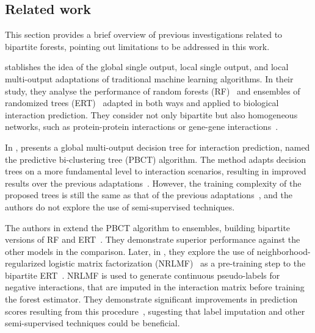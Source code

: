 \begin{itemize}


\section{Related work}
\label{sec:related_work}


This section provides a brief overview of previous investigations related to bipartite forests, pointing out limitations to be addressed in this work.

 stablishes the idea of the global single output, local single output, and local multi-output adaptations of traditional machine learning algorithms. In their study, they analyse the performance of random forests (RF)~\cite{breiman2001random} and ensembles of randomized trees (ERT)~\cite{geurts2006extremely} adapted in both ways and applied to biological interaction prediction. They consider not only bipartite but also homogeneous networks, such as protein-protein interactions or gene-gene interactions~\cite{schrynemackers2015classifying}.

In \citeyear{pliakos2018global}, \citeauthor{pliakos2018global} presents a global multi-output decision tree for interaction prediction, named the predictive bi-clustering tree (PBCT) algorithm.
The method adapts decision trees on a more fundamental level to interaction scenarios, resulting in improved results over the previous adaptations~\cite{pliakos2018global}.
However, the training complexity of the proposed trees is still the same as that of the previous adaptations~\cite{pliakos2018global}, and the authors do not explore the use of semi-supervised techniques.

The authors in \citeyear{pliakos2019network} extend the PBCT algorithm to ensembles, building bipartite versions of RF and ERT~\cite{pliakos2019network}. They demonstrate superior performance against the other models in the comparison.
%
Later, in \citeyear{pliakos2020drugtarget}, they explore the use of neighborhood-regularized logistic matrix factorization (NRLMF)~\cite{liu2016neighborhood} as a pre-training step to the bipartite ERT~\cite{pliakos2020drugtarget}. NRLMF is used to generate continuous pseudo-labels for negative interactions, that are imputed in the interaction matrix before training the forest estimator. They demonstrate significant improvements in prediction scores resulting from this procedure~\cite{pliakos2020drugtarget}, sugesting that label imputation and other semi-supervised techniques could be beneficial.


\end{itemize}
